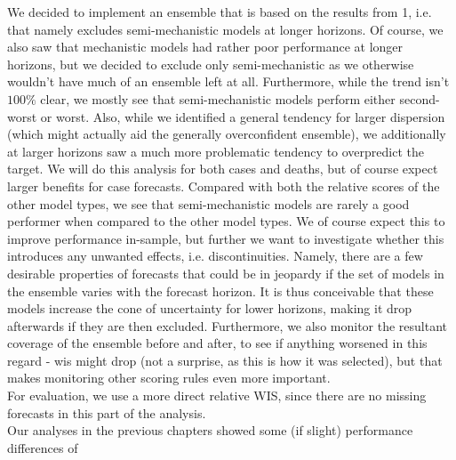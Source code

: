 We decided to implement an ensemble that is based on the results from 1, i.e. that namely excludes semi-mechanistic models at longer horizons. Of course, we also saw that mechanistic models had rather poor performance at longer horizons, but we decided to exclude only semi-mechanistic as we otherwise wouldn't have much of an ensemble left at all. Furthermore, while the trend isn't $100\%$ clear, we mostly see that semi-mechanistic models perform either second-worst or worst. Also, while we identified a general tendency for larger dispersion (which might actually aid the generally overconfident ensemble), we additionally at larger horizons saw a much more problematic tendency to overpredict the target. We will do this analysis for both cases and deaths, but of course expect larger benefits for case forecasts. Compared with both the relative scores of the other model types, we see that semi-mechanistic models are rarely a good performer when compared to the other model types.  We of course expect this to improve performance in-sample, but further we want to investigate whether this introduces any unwanted effects, i.e. discontinuities. Namely, there are a few desirable properties of forecasts that could be in jeopardy if the set of models in the ensemble varies with the forecast horizon. It is thus conceivable that these models increase the cone of uncertainty for lower horizons, making it drop afterwards if they are then excluded. Furthermore, we also monitor the resultant coverage of the ensemble before and after, to see if anything worsened in this regard - wis might drop (not a surprise, as this is how it was selected), but that makes monitoring other scoring rules even more important. \\
For evaluation, we use a more direct relative WIS, since there are no missing forecasts in this part of the analysis.\\
Our analyses in the previous chapters showed some (if slight) performance differences of 
